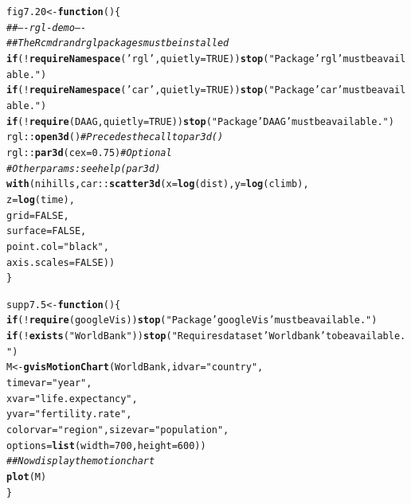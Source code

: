 \documentclass[12pt, a4paper,  BCOR=8.25mm, DIV=15]{scrartcl}\usepackage[]{graphicx}\usepackage[]{color}
\makeatletter
\newcommand{\hlnum}[1]{\textcolor[rgb]{0.686,0.059,0.569}{#1}}%
\newcommand{\hlstr}[1]{\textcolor[rgb]{0.192,0.494,0.8}{#1}}%
\newcommand{\hlcom}[1]{\textcolor[rgb]{0.678,0.584,0.686}{\textit{#1}}}%
\newcommand{\hlopt}[1]{\textcolor[rgb]{0,0,0}{#1}}%
\newcommand{\hlstd}[1]{\textcolor[rgb]{0.345,0.345,0.345}{#1}}%
\newcommand{\hlkwa}[1]{\textcolor[rgb]{0.161,0.373,0.58}{\textbf{#1}}}%
\newcommand{\hlkwb}[1]{\textcolor[rgb]{0.69,0.353,0.396}{#1}}%
\newcommand{\hlkwc}[1]{\textcolor[rgb]{0.333,0.667,0.333}{#1}}%
\newcommand{\hlkwd}[1]{\textcolor[rgb]{0.737,0.353,0.396}{\textbf{#1}}}%
\newenvironment{kframe}{%
 \def\at@end@of@kframe{}%
 \ifinner\ifhmode%
  \def\at@end@of@kframe{\end{minipage}}%
  \begin{minipage}{\columnwidth}%
 \fi\fi%
 \def\FrameCommand##1{\hskip\@totalleftmargin \hskip-\fboxsep
 \colorbox{shadecolor}{##1}\hskip-\fboxsep
     \hskip-\linewidth \hskip-\@totalleftmargin \hskip\columnwidth}%
 \MakeFramed {\advance\hsize-\width
   \@totalleftmargin\z@ \linewidth\hsize
   \@setminipage}}%
 {\par\unskip\endMakeFramed%
 \at@end@of@kframe}
\newenvironment{knitrout}{}{} %
\makeatother
\begin{document}
\begin{knitrout}
\color{fgcolor}\begin{kframe}
\begin{alltt}
\hlstd{fig7.20} \hlkwb{<-} \hlkwa{function}\hlstd{()\{}
\hlcom{## ---- rgl-demo ----}
\hlcom{## The Rcmdr and rgl packages must be installed}
\hlkwa{if}\hlstd{(}\hlopt{!}\hlkwd{requireNamespace}\hlstd{(}\hlstr{'rgl'}\hlstd{,} \hlkwc{quietly}\hlstd{=}\hlnum{TRUE}\hlstd{))}\hlkwd{stop}\hlstd{(}\hlstr{"Package 'rgl' must be available."}\hlstd{)}
\hlkwa{if}\hlstd{(}\hlopt{!}\hlkwd{requireNamespace}\hlstd{(}\hlstr{'car'}\hlstd{,} \hlkwc{quietly}\hlstd{=}\hlnum{TRUE}\hlstd{))}\hlkwd{stop}\hlstd{(}\hlstr{"Package 'car' must be available."}\hlstd{)}
\hlkwa{if}\hlstd{(}\hlopt{!}\hlkwd{require}\hlstd{(DAAG,} \hlkwc{quietly}\hlstd{=}\hlnum{TRUE}\hlstd{))}\hlkwd{stop}\hlstd{(}\hlstr{"Package 'DAAG' must be available."}\hlstd{)}
\hlstd{rgl}\hlopt{::}\hlkwd{open3d}\hlstd{()}            \hlcom{# Precedes the call to par3d()}
\hlstd{rgl}\hlopt{::}\hlkwd{par3d}\hlstd{(}\hlkwc{cex}\hlstd{=}\hlnum{0.75}\hlstd{)}     \hlcom{# Optional}
                         \hlcom{# Other params: see help(par3d)}
\hlkwd{with}\hlstd{(nihills, car}\hlopt{::}\hlkwd{scatter3d}\hlstd{(}\hlkwc{x}\hlstd{=}\hlkwd{log}\hlstd{(dist),} \hlkwc{y}\hlstd{=}\hlkwd{log}\hlstd{(climb),}
                        \hlkwc{z}\hlstd{=}\hlkwd{log}\hlstd{(time),}
                        \hlkwc{grid}\hlstd{=}\hlnum{FALSE}\hlstd{,}
                        \hlkwc{surface}\hlstd{=}\hlnum{FALSE}\hlstd{,}
                        \hlkwc{point.col}\hlstd{=}\hlstr{"black"}\hlstd{,}
                        \hlkwc{axis.scales}\hlstd{=}\hlnum{FALSE}\hlstd{))}
\hlstd{\}}
\end{alltt}
\end{kframe}
\end{knitrout}

\begin{knitrout}
\color{fgcolor}\begin{kframe}
\begin{alltt}
\hlstd{supp7.5} \hlkwb{<-} \hlkwa{function}\hlstd{()\{}
\hlkwa{if}\hlstd{(}\hlopt{!}\hlkwd{require}\hlstd{(googleVis))}\hlkwd{stop}\hlstd{(}\hlstr{"Package 'googleVis' must be available."}\hlstd{)}
\hlkwa{if}\hlstd{(}\hlopt{!}\hlkwd{exists}\hlstd{(}\hlstr{"WorldBank"}\hlstd{))}\hlkwd{stop}\hlstd{(}\hlstr{"Requires dataset 'Worldbank' to be available."}\hlstd{)}
\hlstd{M} \hlkwb{<-} \hlkwd{gvisMotionChart}\hlstd{(WorldBank,} \hlkwc{idvar}\hlstd{=}\hlstr{"country"}\hlstd{,}
          \hlkwc{timevar}\hlstd{=}\hlstr{"year"}\hlstd{,}
          \hlkwc{xvar}\hlstd{=}\hlstr{"life.expectancy"}\hlstd{,}
          \hlkwc{yvar}\hlstd{=}\hlstr{"fertility.rate"}\hlstd{,}
          \hlkwc{colorvar}\hlstd{=}\hlstr{"region"}\hlstd{,} \hlkwc{sizevar}\hlstd{=}\hlstr{"population"}\hlstd{,}
          \hlkwc{options}\hlstd{=}\hlkwd{list}\hlstd{(}\hlkwc{width}\hlstd{=}\hlnum{700}\hlstd{,} \hlkwc{height}\hlstd{=}\hlnum{600}\hlstd{))}
\hlcom{## Now display the motion chart}
\hlkwd{plot}\hlstd{(M)}
\hlstd{\}}
\end{alltt}
\end{kframe}
\end{knitrout}
\end{document}
